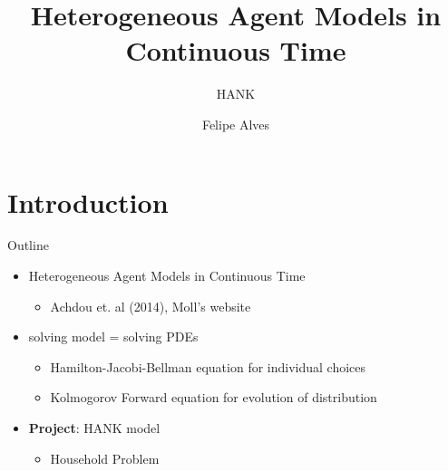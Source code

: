 \documentclass[10pt]{beamer} %
\title{ Heterogeneous Agent Models in Continuous Time \sc }
\subtitle{ HANK }
\author{ Felipe Alves }
\institute[NYU]{NYU}
\theoremstyle{plain}
\theoremstyle{definition}
\theoremstyle{remark}
\begin{document}
\begin{frame}
   \titlepage
\end{frame}


\section{Introduction}

\begin{frame}{Outline}{}  
\begin{itemize}
    
    \item Heterogeneous Agent Models in Continuous Time 
    \begin{itemize}
        \item Achdou et. al (2014), Moll's website
    \end{itemize} \medskip

    \item solving model = solving PDEs

    \begin{itemize}
        \item Hamilton-Jacobi-Bellman equation for individual choices \smallskip
        \item Kolmogorov Forward equation for evolution of distribution 
    \end{itemize} \medskip

    \item \textbf{Project}: HANK model 

    \begin{itemize}
        \item Household Problem 
    \end{itemize}
\end{itemize}
\end{frame}
\end{document}
